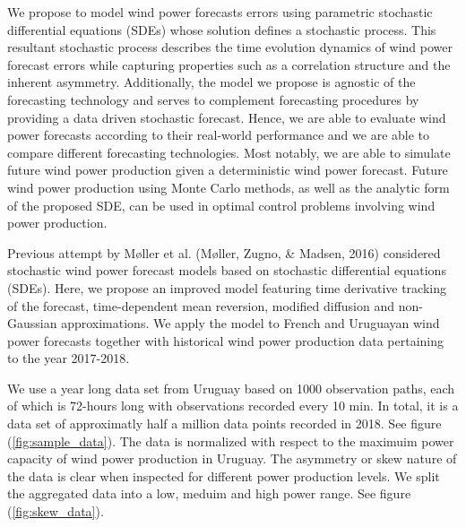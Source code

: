 \documentclass[10pt,twocolumn,letterpaper]{article}
\begin{document}
We propose to model wind power forecasts errors using parametric stochastic differential equations (SDEs) whose solution defines a stochastic process. This resultant stochastic process describes the time evolution dynamics of wind power forecast errors while capturing properties such as a correlation structure and the inherent asymmetry. Additionally, the model we propose is agnostic of the forecasting technology and serves to complement forecasting procedures by providing a data driven stochastic forecast. Hence, we are able to evaluate wind power forecasts according to their real-world performance and we are able to compare different forecasting technologies. Most notably, we are able to simulate future wind power production given a deterministic wind power forecast. Future wind power production using Monte Carlo methods, as well as the analytic form of the proposed SDE, can be used in optimal control problems involving wind power production.

Previous attempt by M\o ller et al. (M\o ller, Zugno, \& Madsen, 2016)  considered stochastic wind power forecast models based on stochastic differential equations (SDEs). Here, we propose an improved model featuring time derivative tracking of the forecast, time-dependent mean reversion, modified diffusion and non-Gaussian approximations. We apply the model to French and Uruguayan wind power forecasts together with historical wind power production data pertaining to the year 2017-2018.

We use a year long data set from Uruguay based on 1000 observation paths, each of which is 72-hours long with observations recorded every 10 min. In total, it is a data set of approximatly half a million data points recorded in 2018. See figure (\ref{fig:sample_data}). The data is normalized with respect to the maximuim power capacity of wind power production in Uruguay. The asymmetry or skew nature of the data is clear when inspected for different power production levels. We split the aggregated data into a low, meduim and high power range. See figure (\ref{fig:skew_data}).
\end{document}
